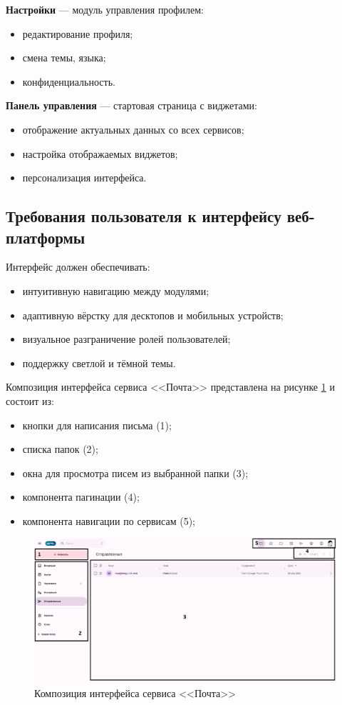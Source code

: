   \textbf{Настройки} — модуль управления профилем:
  \begin{itemize}
    \item редактирование профиля;
    \item смена темы, языка;
    \item конфиденциальность.
  \end{itemize}

  \textbf{Панель управления} — стартовая страница с виджетами:
  \begin{itemize}
    \item отображение актуальных данных со всех сервисов;
    \item настройка отображаемых виджетов;
    \item персонализация интерфейса.
  \end{itemize}

\subsection{Требования пользователя к интерфейсу веб-платформы}

Интерфейс должен обеспечивать:
\begin{itemize}
  \item интуитивную навигацию между модулями;
  \item адаптивную вёрстку для десктопов и мобильных устройств;
  \item визуальное разграничение ролей пользователей;
  \item поддержку светлой и тёмной темы.
\end{itemize}

Композиция интерфейса сервиса <<Почта>> представлена на рисунке \ref{templ:image1} и состоит из:
\begin{itemize}
  \item кнопки для написания письма (1);
  \item списка папок (2);
  \item окна для просмотра писем из выбранной папки (3);
  \item компонента пагинации (4);
  \item компонента навигации по сервисам (5);
\end{itemize}
\begin{figure}[H]
	\centering
	\includegraphics[width=1\linewidth]{images/почта}
	\caption{Композиция интерфейса сервиса <<Почта>>}
	\label{templ:image1}
\end{figure}

